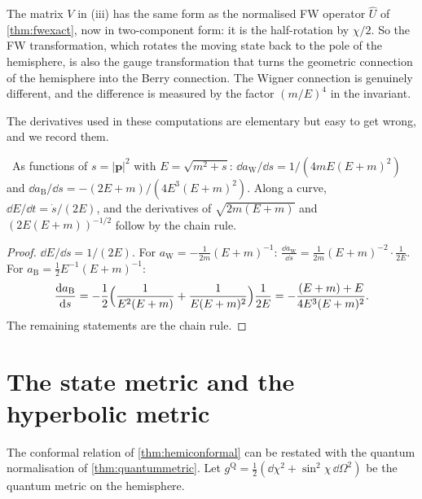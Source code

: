 The matrix $V$ in (iii) has the same form as the normalised FW operator $\hat U$ of \cref{thm:fwexact}, now in two-component form: it is the half-rotation by $\chi/2$. So the FW transformation, which rotates the moving state back to the pole of the hemisphere, is also the gauge transformation that turns the geometric connection of the hemisphere into the Berry connection. The Wigner connection is genuinely different, and the difference is measured by the factor $(m/E)^4$ in the invariant.

The derivatives used in these computations are elementary but easy to get wrong, and we record them.

\begin{lemma}[Derivatives]\label{lem:awderivs}\ver\
As functions of $s=|\mathbf p|^2$ with $E=\sqrt{m^2+s}$: $\dd a_{\mathrm W}/\dd s=1/(4mE(E+m)^2)$ and $\dd a_{\mathrm B}/\dd s=-(2E+m)/(4E^3(E+m)^2)$. Along a curve, $\dd E/\dd t=\dot s/(2E)$, and the derivatives of $\sqrt{2m(E+m)}$ and $(2E(E+m))^{-1/2}$ follow by the chain rule.
\end{lemma}
\begin{proof}
$\dd E/\dd s=1/(2E)$. For $a_{\mathrm W}=-\frac1{2m}(E+m)^{-1}$: $\frac{\dd a_{\mathrm W}}{\dd s}=\frac1{2m}(E+m)^{-2}\cdot\frac1{2E}$. For $a_{\mathrm B}=\frac12E^{-1}(E+m)^{-1}$:
\[
\frac{\mathrm{d} a_{\mathrm B}}{\mathrm{d} s}=-\frac12\Bigl(\frac1{E^2(E+m)}+\frac1{E(E+m)^2}\Bigr)\frac1{2E}=-\frac{(E+m)+E}{4E^3(E+m)^2}.
\]
The remaining statements are the chain rule.
\end{proof}


\section{The state metric and the hyperbolic metric}

The conformal relation of \cref{thm:hemiconformal} can be restated with the quantum normalisation of \cref{thm:quantummetric}. Let $g^{\mathrm Q}=\frac12(\dd\chi^2+\sin^2\chi\,\dd\Omega^2)$ be the quantum metric on the hemisphere.

